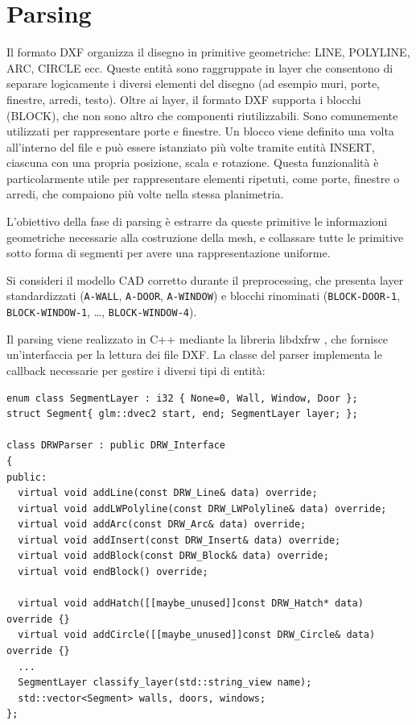 \section{Parsing}
\label{sec:parsing}


Il formato DXF organizza il disegno in primitive geometriche: LINE, POLYLINE, ARC, CIRCLE ecc. Queste entità sono raggruppate in layer che consentono di separare logicamente i diversi elementi del disegno (ad esempio muri, porte, finestre, arredi, testo). Oltre ai layer, il formato DXF supporta i blocchi (BLOCK), che non sono altro che componenti riutilizzabili. Sono comunemente utilizzati per rappresentare porte e finestre. Un blocco viene definito una volta all'interno del file e può essere istanziato più volte tramite entità INSERT, ciascuna con una propria posizione, scala e rotazione. Questa funzionalità è particolarmente utile per rappresentare elementi ripetuti, come porte, finestre o arredi, che compaiono più volte nella stessa planimetria.

L'obiettivo della fase di parsing è estrarre da queste primitive le informazioni geometriche necessarie alla costruzione della mesh, e collassare tutte le primitive sotto forma di segmenti per avere una rappresentazione uniforme.

Si consideri il modello CAD corretto durante il preprocessing, che presenta layer standardizzati (\texttt{A-WALL}, \texttt{A-DOOR}, \texttt{A-WINDOW}) e blocchi rinominati (\texttt{BLOCK-DOOR-1}, \texttt{BLOCK-WINDOW-1}, \ldots, \texttt{BLOCK-WINDOW-4}).

Il parsing viene realizzato in C++ mediante la libreria libdxfrw \cite{libdxfrw}, che fornisce un'interfaccia per la lettura dei file DXF. La classe del parser implementa le callback necessarie per gestire i diversi tipi di entità:
\begin{verbatim}
enum class SegmentLayer : i32 { None=0, Wall, Window, Door };
struct Segment{ glm::dvec2 start, end; SegmentLayer layer; };
	
class DRWParser : public DRW_Interface
{
public:
  virtual void addLine(const DRW_Line& data) override;
  virtual void addLWPolyline(const DRW_LWPolyline& data) override;
  virtual void addArc(const DRW_Arc& data) override;
  virtual void addInsert(const DRW_Insert& data) override;
  virtual void addBlock(const DRW_Block& data) override;
  virtual void endBlock() override;
	
  virtual void addHatch([[maybe_unused]]const DRW_Hatch* data) override {}
  virtual void addCircle([[maybe_unused]]const DRW_Circle& data) override {}
  ...
  SegmentLayer classify_layer(std::string_view name);	
  std::vector<Segment> walls, doors, windows;
};
\end{verbatim}

